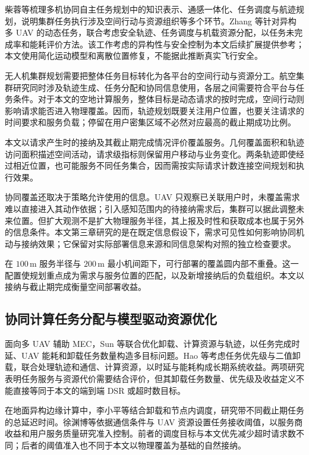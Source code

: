 柴蓉等梳理多机协同自主任务规划中的知识表示、通感一体化、任务调度与航迹规划，说明集群任务执行涉及空间行动与资源组织等多个环节\cite{chai2024planning}。Zhang 等针对异构多 UAV 的动态任务，联合考虑安全轨迹、任务调度与机载资源分配，以任务未完成率和能耗评价方法\cite{zhang2026safe}。该工作考虑的异构性与安全控制为本文后续扩展提供参考；本文使用简化运动模型和离散位置修复，不能据此推断真实飞行安全。


无人机集群规划需要把整体任务目标转化为各平台的空间行动与资源分工。航空集群研究同时涉及轨迹生成、任务分配和协同信息使用，各层之间需要符合平台与任务条件\cite{chung2018swarm}。对于本文的空地计算服务，整体目标是动态请求的按时完成，空间行动则影响请求能否进入物理覆盖。因而，轨迹规划既要关注用户位置，也要关注请求的时间要求和服务负载；停留在用户密集区域不必然对应最高的截止期成功比例。

本文以请求产生时的接纳及其截止期完成情况评价覆盖服务。几何覆盖面积和轨迹访问面积描述空间活动，请求级指标则保留用户移动与业务变化。两条轨迹即使经过相近位置，也可能服务不同任务集合，因而需按实际请求计数连接空间规划和执行效果。

协同覆盖还取决于策略允许使用的信息。UAV 只观察已关联用户时，未覆盖需求难以直接进入其动作依据；引入感知范围内的待接纳需求后，集群可以据此调整未来位置。但扩大观测不是扩大物理服务半径，其上报及时性和获取成本也属于另外的信息条件。本文第三章研究的是在既定信息假设下，需求可见性如何影响协同机动与接纳效果；它保留对实际部署信息来源和同信息架构对照的独立检查要求。

在 $100\,\mathrm{m}$ 服务半径与 $200\,\mathrm{m}$ 最小机间距下，可行部署的覆盖圆内部不重叠。这一配置使规划重点成为需求与服务位置的匹配，以及新增接纳后的负载组织。本文以接纳与截止期完成衡量空间部署收益。

\subsection{协同计算任务分配与模型驱动资源优化}
\label{sec:ch1-model-based}

面向多 UAV 辅助 MEC，Sun 等联合优化卸载、计算资源与轨迹，以任务完成时延、UAV 能耗和卸载任务数量构造多目标问题\cite{sun2024multiobjective}。Hao 等考虑任务优先级与二值卸载，联合处理轨迹和通信、计算资源，以时延与能耗构成长期系统收益\cite{hao2024priority}。两项研究表明任务服务与资源代价需要结合评价，但其卸载任务数量、优先级及收益定义不能直接等同于本文的端到端 DSR 或超时数目标。

在地面异构边缘计算中，李小平等结合卸载和节点内调度，研究带不同截止期任务的总延迟时间\cite{li2023heterogeneous}。徐渊博等依据通信条件与 UAV 资源设置任务接收阈值，以服务商收益和用户服务质量研究准入控制\cite{xu2025admission}。前者的调度目标与本文优先减少超时请求数不同；后者的阈值准入也不同于本文以物理覆盖为基础的自然接纳。

